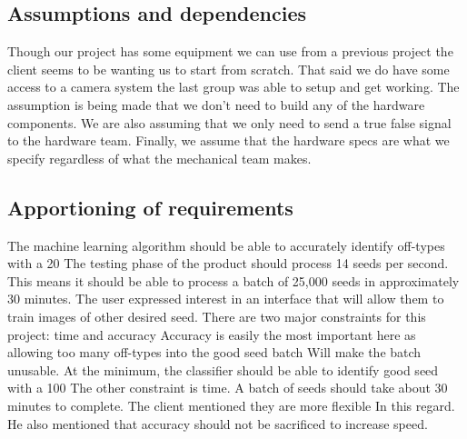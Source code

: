 \documentclass[onecolumn, draftclsnofoot,10pt, compsoc]{IEEEtran}
\begin{document}
\subsection{Assumptions and dependencies}
Though our project has some equipment we can use from a previous project the client seems to be wanting us to start from scratch.
That said we do have some access to a camera system the last group was able to setup and get working.
The assumption is being made that we don’t need to build any of the hardware components.
We are also assuming that we only need to send a true false signal to the hardware team.
Finally, we assume that the hardware specs are what we specify regardless of what the mechanical team makes.

\subsection{Apportioning of requirements}




The machine learning algorithm should be able to accurately identify off-types with a 20%
The testing phase of the product should process 14 seeds per second.
This means it should be able to process a batch of 25,000 seeds in approximately 30 minutes.
The user expressed interest in an interface that will allow them to train images of other desired seed.
There are two major constraints for this project: time and accuracy Accuracy is easily the most
important here as allowing too many off-types into the good seed batch Will make the batch unusable.
At the minimum, the classifier should be able to identify good seed with a 100%
The other constraint is time.
A batch of seeds should take about 30 minutes to complete.
The client mentioned they are more flexible In this regard.
He also mentioned that accuracy should not be sacrificed to increase speed.
\end{document}

